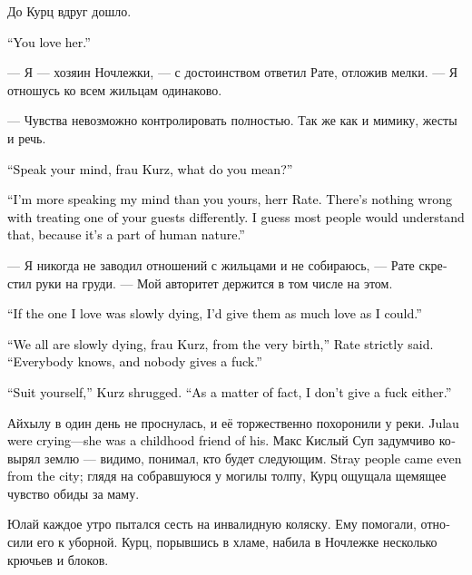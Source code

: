 \documentclass[a4paper,12pt,fleqn]{book}\usepackage{cooltooltips}\usepackage{polyglossia}\setdefaultlanguage[babelshorthands=true]{russian}\setotherlanguage{english}\defaultfontfeatures{Ligatures=TeX,Mapping=tex-text} \usepackage{xcolor}\definecolor{lightgray}{HTML}{bbbbbb}\color{lightgray}\newcommand{\ml}[3]{\textenglish{\textcolor{black}{#3}}}
\newcommand{\textspace}{\vspace{1em}{\centering\Large\bfseries<...>\par}\vspace{1em}}
\begin{document}
До Курц вдруг дошло.

\ml{$0$}
{--- Ты её любишь.}
{``You love her.''}

--- Я --- хозяин Ночлежки, --- с достоинством ответил Рате, отложив мелки.
--- Я отношусь ко всем жильцам одинаково.

--- Чувства невозможно контролировать полностью.
Так же как и мимику, жесты и речь.

\ml{$0$}
{--- Говори прямо, фрау Курц, что ты имеешь в виду?}
{``Speak your mind, frau Kurz, what do you mean?''}

\ml{$0$}
{--- Я была гораздо более пряма, чем ты, герр Рате.}
{``I'm more speaking my mind than you yours, herr Rate.}
\ml{$0$}
{Нет ничего плохого в том, чтобы к одному из жильцов относиться иначе, чем к остальным.}
{There's nothing wrong with treating one of your guests differently.}
\ml{$0$}
{Я думаю, люди бы это поняли, потому что это часть человеческой природы.}
{I guess most people would understand that, because it's a part of human nature.''}

--- Я никогда не заводил отношений с жильцами и не собираюсь, --- Рате скрестил руки на груди.
--- Мой авторитет держится в том числе на этом.

\ml{$0$}
{--- Если бы человек, которого я люблю, медленно умирал, я хотела бы отдать ему как можно больше любви.}
{``If the one I love was slowly dying, I'd give them as much love as I could.''}

\ml{$0$}
{--- Все мы медленно умираем, фрау Курц, с самого рождения, --- строго сказал Рате.}
{``We all are slowly dying, frau Kurz, from the very birth,'' Rate strictly said.}
\ml{$0$}
{--- Все об этом знают, и всем плевать.}
{``Everybody knows, and nobody gives a fuck.''}

\ml{$0$}
{--- Дело твоё, --- пожала плечами Курц.}
{``Suit yourself,'' Kurz shrugged.}
\ml{$0$}
{--- Мне, в общем-то, тоже плевать.}
{``As a matter of fact, I don't give a fuck either.''}

Айхылу в один день не проснулась, и её торжественно похоронили у реки.
\ml{$0$}
{Юлай плакал --- она была его подругой детства.}
{Julau were crying---she was a childhood friend of his.}
Макс Кислый Суп задумчиво ковырял землю --- видимо, понимал, кто будет следующим.
\ml{$0$}
{Бездомные пришли даже из города;}
{Stray people came even from the city;}
глядя на собравшуюся у могилы толпу, Курц ощущала щемящее чувство обиды за маму.

\textspace

Юлай каждое утро пытался сесть на инвалидную коляску.
Ему помогали, относили его к уборной.
Курц, порывшись в хламе, набила в Ночлежке несколько крючьев и блоков.
\end{document}
